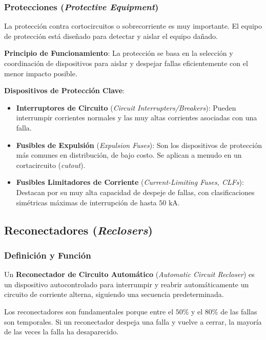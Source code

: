 \subsubsection*{Protecciones (\textit{Protective Equipment})}
La protección contra cortocircuitos o sobrecorriente es muy importante. El equipo de protección está diseñado para detectar y aislar el equipo dañado.

\textbf{Principio de Funcionamiento}: La protección se basa en la selección y coordinación de dispositivos para aislar y despejar fallas eficientemente con el menor impacto posible.

\textbf{Dispositivos de Protección Clave}:
\begin{itemize}
    \item \textbf{Interruptores de Circuito} (\textit{Circuit Interrupters/Breakers}): Pueden interrumpir corrientes normales y las muy altas corrientes asociadas con una falla.
    \item \textbf{Fusibles de Expulsión} (\textit{Expulsion Fuses}): Son los dispositivos de protección más comunes en distribución, de bajo costo. Se aplican a menudo en un cortacircuito (\textit{cutout}).
    \item \textbf{Fusibles Limitadores de Corriente} (\textit{Current-Limiting Fuses, CLFs}): Destacan por su muy alta capacidad de despeje de fallas, con clasificaciones simétricas máximas de interrupción de hasta $50 \text{ kA}$.
\end{itemize}

\subsection*{Reconectadores (\textit{Reclosers})}

\subsubsection*{Definición y Función}
Un \textbf{Reconectador de Circuito Automático} (\textit{Automatic Circuit Recloser}) es un dispositivo autocontrolado para interrumpir y reabrir automáticamente un circuito de corriente alterna, siguiendo una secuencia predeterminada.

Los reconectadores son fundamentales porque entre el $50\%$ y el $80\%$ de las fallas son temporales. Si un reconectador despeja una falla y vuelve a cerrar, la mayoría de las veces la falla ha desaparecido.

